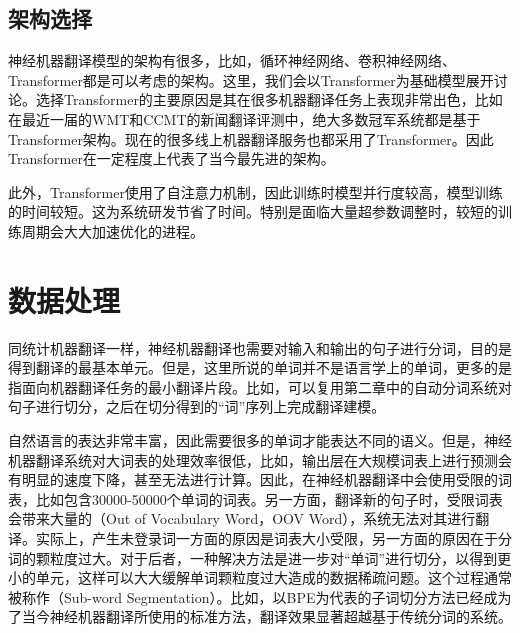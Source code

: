 
\subsection{架构选择 }
\parinterval 神经机器翻译模型的架构有很多，比如，循环神经网络、卷积神经网络、Transformer都是可以考虑的架构。这里，我们会以Transformer为基础模型展开讨论。选择Transformer的主要原因是其在很多机器翻译任务上表现非常出色，比如在最近一届的WMT和CCMT的新闻翻译评测中，绝大多数冠军系统都是基于Transformer架构。现在的很多线上机器翻译服务也都采用了Transformer。因此Transformer在一定程度上代表了当今最先进的架构。

\parinterval 此外，Transformer使用了自注意力机制，因此训练时模型并行度较高，模型训练的时间较短。这为系统研发节省了时间。特别是面临大量超参数调整时，较短的训练周期会大大加速优化的进程。


\sectionnewpage
\section{数据处理}

\parinterval 同统计机器翻译一样，神经机器翻译也需要对输入和输出的句子进行分词，目的是得到翻译的最基本单元。但是，这里所说的单词并不是语言学上的单词，更多的是指面向机器翻译任务的最小翻译片段。比如，可以复用第二章中的自动分词系统对句子进行切分，之后在切分得到的``词''序列上完成翻译建模。

\parinterval 自然语言的表达非常丰富，因此需要很多的单词才能表达不同的语义。但是，神经机器翻译系统对大词表的处理效率很低，比如，输出层在大规模词表上进行预测会有明显的速度下降，甚至无法进行计算。因此，在神经机器翻译中会使用受限的词表，比如包含30000-50000个单词的词表。另一方面，翻译新的句子时，受限词表会带来大量的{\small{}}（Out of Vocabulary Word，OOV Word），系统无法对其进行翻译。实际上，产生未登录词一方面的原因是词表大小受限，另一方面的原因在于分词的颗粒度过大。对于后者，一种解决方法是进一步对``单词''进行切分，以得到更小的单元，这样可以大大缓解单词颗粒度过大造成的数据稀疏问题。这个过程通常被称作{\small{}}（Sub-word Segmentation）。比如，以BPE为代表的子词切分方法已经成为了当今神经机器翻译所使用的标准方法，翻译效果显著超越基于传统分词的系统。

